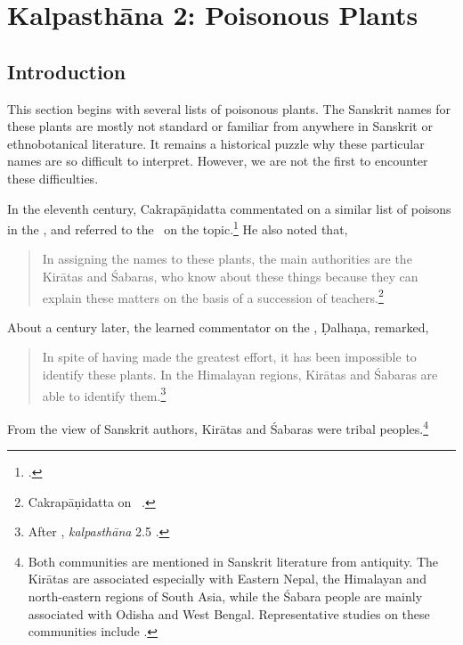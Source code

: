 \newcommand{\plant}[4]{#1 (\emph{#2})\footnoteA{#3; see #4}}
\let\chemical = \plant
\newcommand{\skt}[2]{#1 (\emph{#2})}
\newcommand{\sskt}[2]{\empty}
%

\chapter{Kalpasthāna 2: Poisonous Plants}

\section{Introduction}

This section begins with several lists of poisonous plants.  The
Sanskrit names for these plants are mostly not standard or familiar
from anywhere in Sanskrit or ethnobotanical literature.  It remains a
historical puzzle why these particular names are so difficult to
interpret. However, we are not the first to encounter these
difficulties. 

In the eleventh century, Cakrapāṇidatta commentated on 
a similar list of poisons in the \CS, and referred to the \SS\ on the 
topic.\footnote{.}   He 
also noted that,
\begin{quote}
    In assigning the names to these plants, the main authorities are
the Kirātas and Śabaras, who know about these things because they
can explain these matters on the basis of a succession of
teachers.\footnote{Cakrapāṇidatta on \CS\ .}
\end{quote}
\par
\noindent
About a century later, the learned commentator on the \SS, Ḍalhaṇa, 
remarked,
\begin{quote}
    \label{kiratas}
In spite of having made the greatest effort, it has been impossible to
identify these plants. In the Himalayan regions, Kirātas and Śabaras
are able to identify them.\footnote{After \SS, \emph{kalpasthāna} 2.5
    \citep[564]{vulgate}.}
\end{quote}
From the view of Sanskrit authors, Kirātas and Śabaras were tribal
peoples.\footnote{Both communities are mentioned in Sanskrit
    literature from antiquity.  The Kirātas are associated especially
    with Eastern Nepal, the Himalayan and north-eastern regions of South
    Asia, while the Śabara people are mainly associated with Odisha and
    West Bengal.  Representative studies on these communities include
    \citet{chat-1951,sing-2008,roy-1970,elwi-1955,subb-1999,rai-2019a,sing-1990}.}
     
